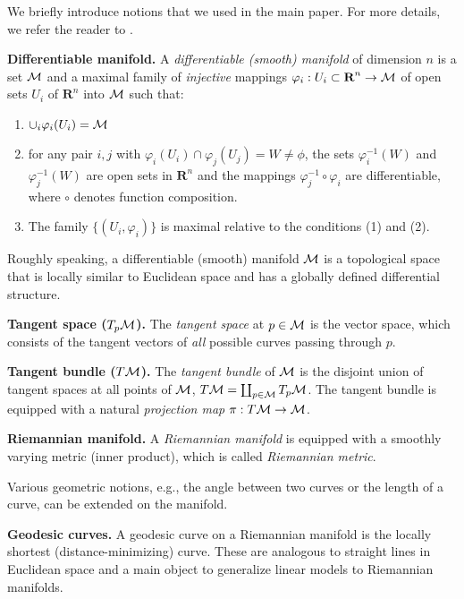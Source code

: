 We briefly introduce notions that we used in the main paper. For more details, we refer the reader to \cite{do1992riemannian,lee2003smooth,spivak1981comprehensive}.


\textbf{Differentiable manifold.}
A \textit{differentiable (smooth) manifold} of dimension $n$ is a set $\mathcal{M}$ and a maximal family of \textit{injective} mappings $\varphi_{i}:U_{i}
\subset \textbf{R}^{n} \rightarrow \mathcal{M}$ of open sets $U_{i}$ of
$\textbf{R}^{n}$ into $\mathcal{M}$ such that:
\begin{enumerate}
\item $\cup_{i}\varphi_{i}(U_{i}) =\mathcal{M}$
\item for any pair $i,j$ with $\varphi_{i} (U_{i}) \cap
\varphi_{j} (U_{j}) = W \neq \phi$, the sets $\varphi_{i}^{-1}(W)$
and $\varphi_{j}^{-1}(W)$ are open sets in $\textbf{R}^{n}$ and the
mappings $\varphi_{j}^{-1} \circ \varphi_{i}$ are
differentiable, where $\circ$ denotes function composition. 
\item The family $\{(U_{i},\varphi_{i})\}$ is maximal relative to
the conditions (1) and (2). 
\end{enumerate}

Roughly speaking, a differentiable (smooth) manifold $\mathcal{M}$ is a topological
space that is locally similar to Euclidean space and has a globally
defined differential structure. 

\textbf{Tangent space ($T_{p}\mathcal{M}$).} The \textit{tangent space} at $p \in \mathcal{M}$ is the vector space, which consists of 
the tangent vectors of {\em all} possible curves passing through $p$. 

\noindent\textbf{Tangent bundle ($T\mathcal{M}$).} The \textit{tangent bundle} of $\mathcal{M}$ is the disjoint union of tangent spaces at all points of $\mathcal{M}$, 
$T\mathcal{M} = \coprod_{p \in \mathcal{M}}T_{p}\mathcal{M}$. 
The tangent bundle is equipped with a natural \textit{projection map} $\pi: T\mathcal{M} \rightarrow \mathcal{M}$. 

\textbf{Riemannian manifold.} A \textit{Riemannian manifold} is 
equipped with a
smoothly varying metric (inner product), which is called \textit{Riemannian metric}. 

Various geometric notions, e.g., the angle between two curves or the length of a curve, can be extended on the manifold. 

\textbf{Geodesic curves.} A geodesic curve on a Riemannian manifold is the locally shortest (distance-minimizing) curve.
These are analogous to straight lines in Euclidean space and a main object to generalize linear models to Riemannian manifolds.

